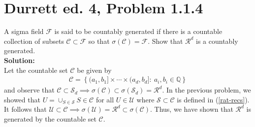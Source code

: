 \documentclass[12pt]{article}
\newcommand{\Sd}{\mathcal{S}_d}
\newcommand{\U}{\mathcal{U}}
\begin{document}
    \section*{Durrett ed. 4, Problem 1.1.4}
    A sigma field $\mathcal F$ is said to be countably generated if there is a countable collection of subsets $\mathscr C\subset \mathcal F$
    so that $\sigma(\mathscr C) = \mathcal F$. Show that $\mathcal R^d$ is a countably generated.\\

    \textbf{Solution:}\\
    Let the countable set $\mathscr C$ be given by
    \begin{align}
        \mathscr C = \left\{(a_1, b_1]\times\cdots\times(a_d, b_d]: \ a_i, b_i\in\mathbb Q\right\}
    \end{align}
    and observe that $\mathscr C\subset\Sd\implies\sigma(\mathscr C)\subset\sigma(\Sd) = \mathcal R^d$. In the previous problem, we showed that
    $U = \cup_{S\in\mathscr S}S\in\mathscr C$ for all $U\in\U$ where $\mathscr S\subset \mathscr C$ is defined in (\ref{rat-recs}). 
    It follows that $\U\subset\mathscr C\implies \sigma(\U) = \mathcal R^d \subset\sigma(\mathscr C)$.
    Thus, we have shown that $\mathcal R^d$ is generated by the countable set $\mathscr C$.
\end{document}
